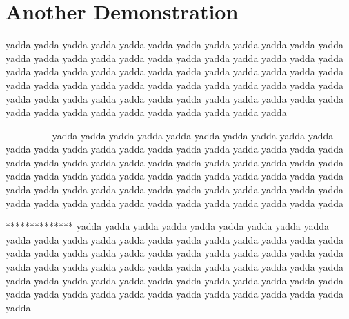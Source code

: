 \chapter{Another Demonstration
}
\begin{multicols}{2}yadda yadda yadda yadda yadda yadda yadda yadda yadda yadda
yadda yadda yadda yadda yadda yadda yadda yadda yadda yadda
yadda yadda yadda yadda yadda yadda yadda yadda yadda yadda
yadda yadda yadda yadda yadda yadda yadda yadda yadda yadda
yadda yadda yadda yadda yadda yadda yadda yadda yadda yadda
yadda yadda yadda yadda yadda yadda yadda yadda yadda yadda
yadda yadda yadda yadda yadda yadda yadda yadda yadda yadda\mktsShowpar\par

--------------
yadda yadda yadda yadda yadda yadda yadda yadda yadda yadda
yadda yadda yadda yadda yadda yadda yadda yadda yadda yadda
yadda yadda yadda yadda yadda yadda yadda yadda yadda yadda
yadda yadda yadda yadda yadda yadda yadda yadda yadda yadda
yadda yadda yadda yadda yadda yadda yadda yadda yadda yadda
yadda yadda yadda yadda yadda yadda yadda yadda yadda yadda
yadda yadda yadda yadda yadda yadda yadda yadda yadda yadda\mktsShowpar\par

**************
yadda yadda yadda yadda yadda yadda yadda yadda yadda yadda
yadda yadda yadda yadda yadda yadda yadda yadda yadda yadda
yadda yadda yadda yadda yadda yadda yadda yadda yadda yadda
yadda yadda yadda yadda yadda yadda yadda yadda yadda yadda
yadda yadda yadda yadda yadda yadda yadda yadda yadda yadda
yadda yadda yadda yadda yadda yadda yadda yadda yadda yadda
yadda yadda yadda yadda yadda yadda yadda yadda yadda yadda\mktsShowpar\par
\end{multicols}
